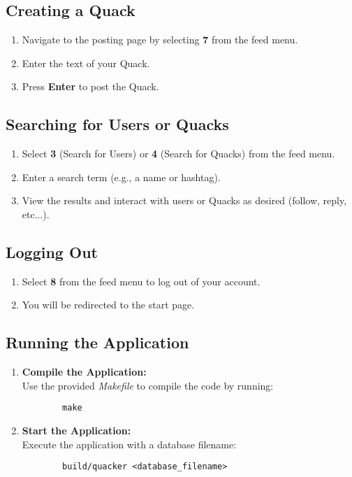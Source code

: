 \documentclass[11pt]{article}
\begin{document}
\subsection*{Creating a Quack}
\begin{enumerate}
    \item Navigate to the posting page by selecting \textbf{7} from the feed menu.
    \item Enter the text of your Quack.
    \item Press \textbf{Enter} to post the Quack.
\end{enumerate}

\subsection*{Searching for Users or Quacks}
\begin{enumerate}
    \item Select \textbf{3} (Search for Users) or \textbf{4} (Search for Quacks) from the feed menu.
    \item Enter a search term (e.g., a name or hashtag).
    \item View the results and interact with users or Quacks as desired (follow, reply, etc...).
\end{enumerate}

\subsection*{Logging Out}
\begin{enumerate}
    \item Select \textbf{8} from the feed menu to log out of your account.
    \item You will be redirected to the start page.
\end{enumerate}



  \subsection*{Running the Application}
	\begin{enumerate}
		\item \textbf{Compile the Application:} \\
		Use the provided \textit{Makefile} to compile the code by running:
		\begin{verbatim}
		make
		\end{verbatim}
		\item \textbf{Start the Application:} \\
		Execute the application with a database filename:
		\begin{verbatim}
		build/quacker <database_filename>
		\end{verbatim}
	\end{enumerate}
\end{document}
